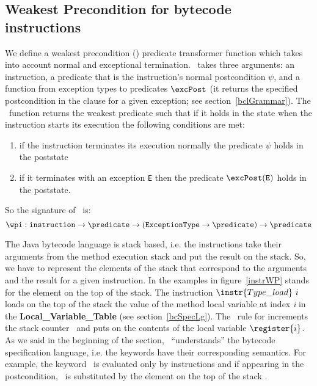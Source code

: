 \subsection{Weakest Precondition for bytecode \\instructions}\label{wpInstr}
We define a weakest precondition (\wpi) predicate transformer function which takes into account normal and exceptional termination. 
\wpi \ takes three arguments: an instruction, a predicate that is the instruction's normal postcondition $\psi$, and a function
from exception types to predicates $\excPost$ (it returns the specified postcondition in the  clause for a given exception; see section~\ref{bclGrammar}).
The \wpi \ function returns the weakest predicate such that if it holds in the state when the instruction starts its execution the following conditions are met: 
\begin{enumerate}
	\item if the instruction terminates its execution normally the predicate $\psi$ holds in the poststate 
	\item if it terminates with an exception \texttt{E} then the predicate $\excPost(\tt{E})$ holds in the poststate.
\end{enumerate}
 So the signature of \wpi \ is:
$$\wpi : \texttt{instruction} \rightarrow \predicate \rightarrow (\tt{ ExceptionType} \rightarrow  \predicate) \rightarrow \predicate   $$

 The Java bytecode language is stack based, i.e. the instructions take their arguments from the method execution stack and 
 put the result on the stack. So, we have to represent the elements of the stack that correspond to the arguments and the result for a given instruction. 
 In the examples in figure~\ref{instrWP} \stack{\counter} stands for the element on the top of the stack. 
 The instruction $\instr{Type\_load} \ i$  loads on the top of the stack the value of the method local variable at index \textit{i}
 in the \textbf{Local\_Variable\_Table} (see section~\ref{bcSpecLg}). The \wpi \ rule for   increments the stack
counter \counter \ and puts on \stack{\counter} the contents of the local variable $\register{i}$.
As we said in the beginning of the section, \wpi \ ``understands'' the bytecode specification language, i.e. the keywords have their 
corresponding semantics. For example, the keyword \result \ is evaluated only by  
instructions and if appearing in the postcondition, \result \ is substituted by the element on the top of 
the stack \stack{\counter}. 


